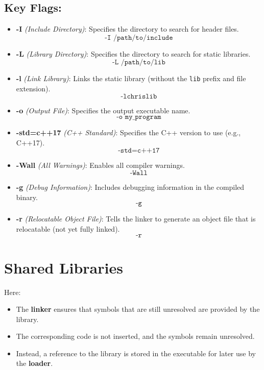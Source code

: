 \subsection*{Key Flags:}
\begin{itemize}
    \item \textbf{-I} \textit{(Include Directory)}: Specifies the directory to search for header files. 
    \[
    \texttt{-I /path/to/include}
    \]
    
    \item \textbf{-L} \textit{(Library Directory)}: Specifies the directory to search for static libraries.
    \[
    \texttt{-L /path/to/lib}
    \]

    \item \textbf{-l} \textit{(Link Library)}: Links the static library (without the \texttt{lib} prefix and file extension).
    \[
    \texttt{-lchrislib}
    \]

    \item \textbf{-o} \textit{(Output File)}: Specifies the output executable name.
    \[
    \texttt{-o my\_program}
    \]

    \item \textbf{-std=c++17} \textit{(C++ Standard)}: Specifies the C++ version to use (e.g., C++17).
    \[
    \texttt{-std=c++17}
    \]

    \item \textbf{-Wall} \textit{(All Warnings)}: Enables all compiler warnings.
    \[
    \texttt{-Wall}
    \]

    \item \textbf{-g} \textit{(Debug Information)}: Includes debugging information in the compiled binary.
    \[
    \texttt{-g}
    \]

    \item \textbf{-r} \textit{(Relocatable Object File)}: Tells the linker to generate an object file that is relocatable (not yet fully linked). 
    \[
    \texttt{-r}
    \]
\end{itemize}



\section{Shared Libraries}

Here:
\begin{itemize}
    \item The \textbf{linker} ensures that symbols that are still unresolved are provided by the library. 
    \item The corresponding code is not inserted, and the symbols remain unresolved.
    \item Instead, a reference to the library is stored in the executable for later use by the \textbf{loader}.
\end{itemize}

